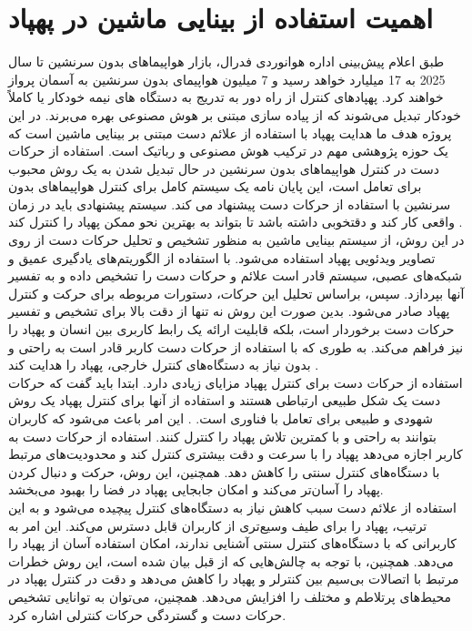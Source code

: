  \section{اهمیت استفاده از بینایی ماشین در پهپاد}
 طبق اعلام پیش‌بینی اداره هوانوردی فدرال، بازار هواپیماهای بدون سرنشین تا سال 2025 به 17 میلیارد خواهد رسید و 7 میلیون هواپیمای بدون سرنشین به آسمان پرواز خواهند‌ کرد. پهپادهای کنترل
 از راه دور به تدریج به دستگاه های نیمه خودکار یا کاملاً خودکار تبدیل می‌شوند که از پیاده سازی مبتنی بر هوش مصنوعی بهره می‌برند. 
 در این پروژه هدف ما هدایت پهپاد با استفاده از علائم دست مبتنی بر بینایی ماشین است که یک حوزه پژوهشی مهم در ترکیب هوش مصنوعی و رباتیک است. 
 استفاده از حرکات دست در کنترل هواپیماهای بدون سرنشین در حال تبدیل شدن به یک روش محبوب برای تعامل است، این پایان نامه یک سیستم کامل برای کنترل هواپیماهای بدون سرنشین 
 با استفاده از حرکات دست پیشنهاد می کند. سیستم پیشنهادی باید در زمان واقعی کار کند و دقتخوبی داشته باشد تا بتواند به بهترین نحو ممکن پهپاد را کنترل کند \cite{hadri2018hand}.
 \\
 در این روش، از سیستم بینایی ماشین به منظور تشخیص و تحلیل حرکات دست از روی تصاویر ویدئویی پهپاد استفاده می‌شود. با استفاده از الگوریتم‌های یادگیری عمیق و شبکه‌های عصبی، سیستم 
 قادر است علائم و حرکات دست را تشخیص داده و به تفسیر آنها بپردازد. سپس، براساس تحلیل این حرکات، دستورات مربوطه برای حرکت و کنترل پهپاد صادر می‌شود.
 بدین صورت این روش نه تنها از دقت بالا برای تشخیص و تفسیر حرکات دست برخوردار است، بلکه قابلیت ارائه یک رابط کاربری بین انسان و پهپاد را نیز فراهم می‌کند. 
 به طوری که با استفاده از حرکات دست کاربر قادر است به راحتی و بدون نیاز به دستگاه‌های کنترل خارجی، پهپاد را هدایت کند \cite{yoo2022motion}.
\\
استفاده از حرکات دست برای کنترل پهپاد مزایای زیادی دارد. ابتدا باید گفت که حرکات دست یک شکل طبیعی ارتباطی هستند و استفاده از آنها برای کنترل پهپاد یک روش شهودی و طبیعی برای تعامل با فناوری است.
. این امر باعث می‌شود که کاربران بتوانند به راحتی و با کمترین تلاش پهپاد را کنترل کنند. استفاده از حرکات دست به کاربر اجازه می‌دهد پهپاد را با سرعت و دقت
بیشتری کنترل کند و محدودیت‌های مرتبط با دستگاه‌های کنترل سنتی را کاهش دهد. همچنین، این روش، حرکت و دنبال کردن پهپاد را آسان‌تر می‌کند و امکان جابجایی پهپاد در فضا را بهبود می‌بخشد.
\\
استفاده از علائم دست سبب کاهش نیاز به دستگاه‌های کنترل پیچیده می‌شود و به این ترتیب، پهپاد را برای طیف وسیع‌تری از کاربران قابل دسترس می‌کند.
این امر به کاربرانی که با دستگاه‌های کنترل سنتی آشنایی ندارند، امکان استفاده آسان از پهپاد را می‌دهد. همچنین، با توجه به چالش‌هایی که از قبل بیان شده است، 
این روش خطرات مرتبط با اتصالات بی‌سیم بین کنترلر و پهپاد را کاهش می‌دهد و دقت در کنترل پهپاد در محیط‌های پرتلاطم و مختلف را افزایش می‌دهد. 
همچنین، می‌توان به توانایی تشخیص حرکات دست و گستردگی حرکات کنترلی اشاره کرد.

